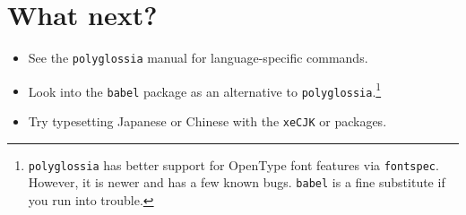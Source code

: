 \section{What next?}
\begin{flushleft}
\begin{itemize}
\item See the \texttt{polyglossia} manual for language-specific commands.
\item Look into the \texttt{babel} package as an alternative to
    \texttt{polyglossia}.\punckern\footnote{\texttt{polyglossia} has better
    support for OpenType font features via \texttt{fontspec}.
    However, it is newer and has a few known bugs.
    \texttt{babel} is a fine substitute if you run into trouble.}
\item Try typesetting Japanese or Chinese with the \texttt{xeCJK} or
     packages.
\end{itemize}
\end{flushleft}
